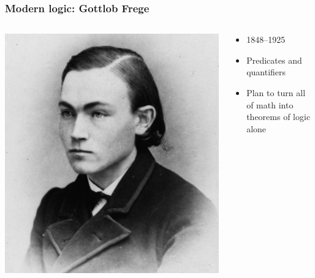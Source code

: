 \begin{frame}
  \frametitle{Modern logic: Gottlob Frege}

  \begin{columns}
    \begin{column}{.5\textwidth}
      \includegraphics[height=.8\textheight]{../assets/frege}
    \end{column}
    \begin{column}{.5\textwidth}
      \begin{itemize}[<+->]
        \item 1848--1925
        \item Predicates and quantifiers
        \item Plan to turn all of math into theorems of logic alone
      \end{itemize}
    \end{column}
  \end{columns}
\end{frame}

